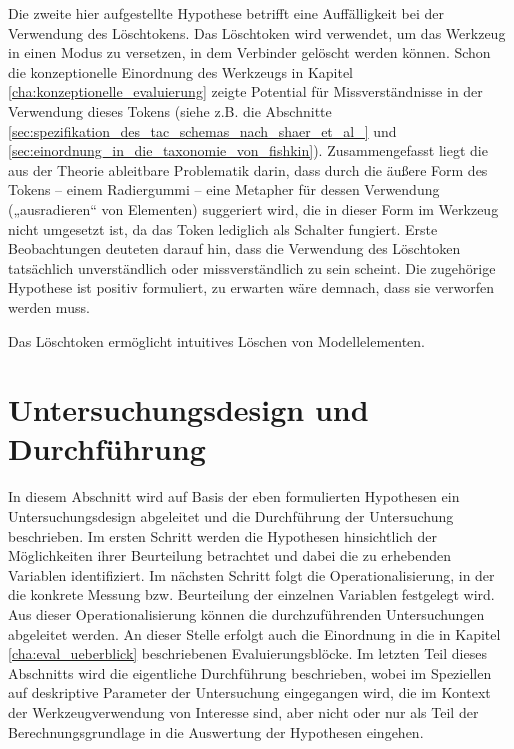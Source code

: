 Die zweite hier aufgestellte Hypothese betrifft eine Auffälligkeit bei der Verwendung des Löschtokens. Das Löschtoken wird verwendet, um das Werkzeug in einen Modus zu versetzen, in dem Verbinder gelöscht werden können. Schon die konzeptionelle Einordnung des Werkzeugs in Kapitel \ref{cha:konzeptionelle_evaluierung} zeigte Potential für Missverständnisse in der Verwendung dieses Tokens (siehe z.B. die Abschnitte \ref{sec:spezifikation_des_tac_schemas_nach_shaer_et_al_} und \ref{sec:einordnung_in_die_taxonomie_von_fishkin}). Zusammengefasst liegt die aus der Theorie ableitbare Problematik darin, dass durch die äußere Form des Tokens -- einem Radiergummi -- eine Metapher für dessen Verwendung („ausradieren“ von Elementen) suggeriert wird, die in dieser Form im Werkzeug nicht umgesetzt ist, da das Token lediglich als Schalter fungiert. Erste Beobachtungen deuteten darauf hin, dass die Verwendung des Löschtoken tatsächlich unverständlich oder missverständlich zu sein scheint. Die zugehörige Hypothese ist positiv formuliert, zu erwarten wäre demnach, dass sie verworfen werden muss.

\begin{hyp}
	\label{hyp:radierer}
	Das Löschtoken ermöglicht intuitives Löschen von Modellelementen.
\end{hyp}


\section{Untersuchungsdesign und Durchführung} %
\label{sec:untersuchungsdesign}

In diesem Abschnitt wird auf Basis der eben formulierten Hypothesen ein Untersuchungsdesign abgeleitet und die Durchführung der Untersuchung beschrieben. Im ersten Schritt werden die Hypothesen hinsichtlich der Möglichkeiten ihrer Beurteilung betrachtet und dabei die zu erhebenden Variablen identifiziert. Im nächsten Schritt folgt die Operationalisierung, in der die konkrete Messung bzw. Beurteilung der einzelnen Variablen festgelegt wird. Aus dieser Operationalisierung können die durchzuführenden Untersuchungen abgeleitet werden. An dieser Stelle erfolgt auch die Einordnung in die in Kapitel \ref{cha:eval_ueberblick} beschriebenen Evaluierungsblöcke. Im letzten Teil dieses Abschnitts wird die eigentliche Durchführung beschrieben, wobei im Speziellen auf deskriptive Parameter der Untersuchung eingegangen wird, die im Kontext der Werkzeugverwendung von Interesse sind, aber nicht oder nur als Teil der Berechnungsgrundlage in die Auswertung der Hypothesen eingehen.

